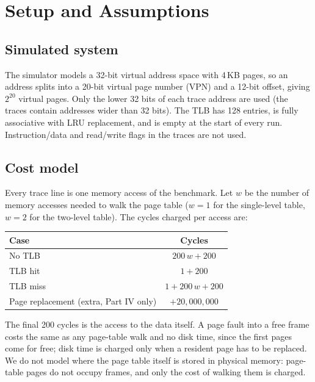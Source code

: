 \documentclass[11pt,a4paper]{article}
\begin{document}
\section{Setup and Assumptions}

\subsection{Simulated system}
The simulator models a 32-bit virtual address space with 4\,KB pages, so an address splits into a 20-bit virtual page number (VPN) and a 12-bit offset, giving $2^{20}$ virtual pages. Only the lower 32 bits of each trace address are used (the traces contain addresses wider than 32 bits). The TLB has 128 entries, is fully associative with LRU replacement, and is empty at the start of every run. Instruction/data and read/write flags in the traces are not used.

\subsection{Cost model}
Every trace line is one memory access of the benchmark. Let $w$ be the number of memory accesses needed to walk the page table ($w=1$ for the single-level table, $w=2$ for the two-level table). The cycles charged per access are:
\begin{center}
\begin{tabular}{lc}
\toprule
Case & Cycles \\
\midrule
No TLB & $200\,w + 200$ \\
TLB hit & $1 + 200$ \\
TLB miss & $1 + 200\,w + 200$ \\
Page replacement (extra, Part IV only) & $+20{,}000{,}000$ \\
\bottomrule
\end{tabular}
\end{center}
The final 200 cycles is the access to the data itself. A page fault into a free frame costs the same as any page-table walk and no disk time, since the first pages come for free; disk time is charged only when a resident page has to be replaced. We do not model where the page table itself is stored in physical memory: page-table pages do not occupy frames, and only the cost of walking them is charged.
\end{document}

